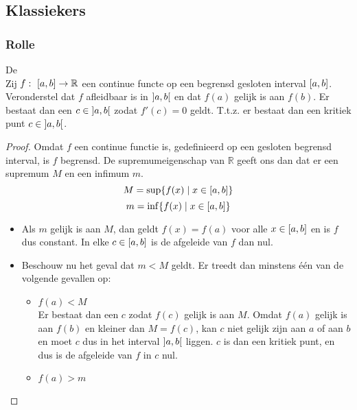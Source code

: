 \documentclass[main.tex]{subfiles}
\begin{document}

\subsection{Klassiekers}
\label{sec:twee-klassiekers}

\subsubsection{Rolle}
\label{sec:rolle}

\begin{bst}
  \label{st:rolle}
  De \\
  Zij $f:\ \interval{a}{b} \rightarrow \mathbb{R}$ een continue functe op een begrensd gesloten interval $\interval{a}{b}$.
  Veronderstel dat $f$ afleidbaar is in $\interval[open]{a}{b}$ en dat $f(a)$ gelijk is aan $f(b)$.
  Er bestaat dan een $c\in \interval[open]{a}{b}$ zodat $f'(c)=0$ geldt.
  T.t.z. er bestaat dan een kritiek punt $c\in \interval[open]{a}{b}$.

  \begin{proof}
    Omdat $f$ een continue functie is, gedefinieerd op een gesloten begrensd interval, is $f$ begrensd.\needed
    De supremumeigenschap van $\mathbb{R}$ geeft ons dan dat er een supremum $M$ en een infimum $m$.
    \[ M = \sup\{f(x) \mid x \in \interval{a}{b} \} \]
    \[ m = \inf\{f(x) \mid x \in \interval{a}{b} \} \]
    \begin{itemize}
    \item
      Als $m$ gelijk is aan $M$, dan geldt $f(x)=f(a)$ voor alle $x \in \interval{a}{b}$ en is $f$ dus constant.
      In elke $c \in \interval{a}{b}$ is de afgeleide van $f$ dan nul.
    \item 
      Beschouw nu het geval dat $m< M$ geldt.
      Er treedt dan minstens \'e\'en van de volgende gevallen op:
      \begin{itemize}
      \item $f(a) < M$\\
        Er bestaat dan een $c$ zodat $f(c)$ gelijk is aan $M$.
        Omdat $f(a)$ gelijk is aan $f(b)$ en kleiner dan $M=f(c)$, kan $c$ niet gelijk zijn aan $a$ of aan $b$ en moet $c$ dus in het interval $\interval[open]{a}{b}$ liggen.
        $c$ is dan een kritiek punt, en dus is de afgeleide van $f$ in $c$ nul.
      \item $f(a) > m$\\
      \end{itemize}
    \end{itemize}
  \end{proof}
\end{bst}
\end{document}
